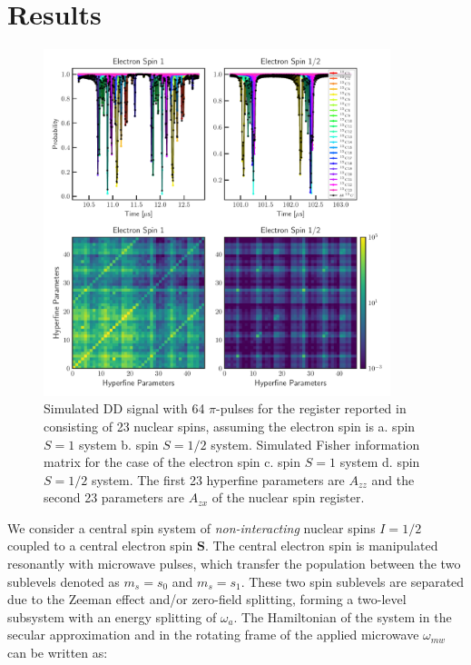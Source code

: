 \documentclass[%
 reprint,
superscriptaddress,
 amsmath,amssymb,
 aps,
]{revtex4-2}
\begin{document}
\section{Results}
\label{sec:theory}
\begin{figure}%
	\begin{center}
		\includegraphics[width=0.9\textwidth]{pict/dd_compare2.pdf}
		\caption{Simulated DD signal with 64 $\pi$-pulses for the register reported in  \cite{abobeih2019atomic} consisting of 23 nuclear spins, assuming the electron spin is a. spin $S=1$ system b. spin $S=1/2$ system. Simulated Fisher information matrix for the case of the electron spin c. spin $S=1$ system d. spin $S=1/2$ system. The first 23 hyperfine parameters are $A_{zz}$ and the second 23 parameters are $A_{zx}$ of the nuclear spin register.}
		\label{fig:3}
	\end{center}
\end{figure}
We consider a central spin system of \textit{non-interacting} nuclear spins $I=1/2$ coupled to a central electron spin $\boldsymbol{S}$.
The central electron spin is manipulated resonantly with microwave pulses, which transfer the population between the two sublevels denoted as $m_s=s_0$ and $m_s = s_1$.
These two spin sublevels are separated due to the Zeeman effect and/or zero-field splitting, forming a two-level subsystem with an energy splitting of $\omega_a$.
The Hamiltonian of the system in the secular approximation and in the rotating frame of the applied microwave $\omega_{mw}$ can be written as:
\end{document}

